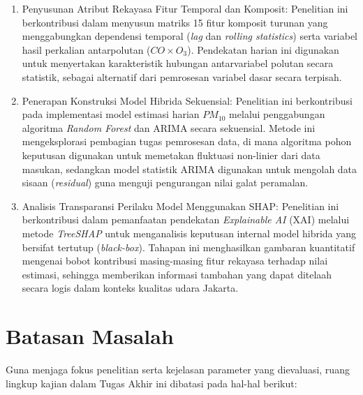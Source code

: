 \begin{enumerate}
   \item {Penyusunan Atribut Rekayasa Fitur Temporal dan Komposit:} Penelitian ini berkontribusi dalam menyusun matriks 15 fitur komposit turunan yang menggabungkan dependensi temporal (\textit{lag} dan \textit{rolling statistics}) serta variabel hasil perkalian antarpolutan ($CO \times O_3$). Pendekatan harian ini digunakan untuk menyertakan karakteristik hubungan antarvariabel polutan secara statistik, sebagai alternatif dari pemrosesan variabel dasar secara terpisah.
   \item {Penerapan Konstruksi Model Hibrida Sekuensial:} Penelitian ini berkontribusi pada implementasi model estimasi harian $PM_{10}$ melalui penggabungan algoritma \textit{Random Forest} dan ARIMA secara sekuensial. Metode ini mengeksplorasi pembagian tugas pemrosesan data, di mana algoritma pohon keputusan digunakan untuk memetakan fluktuasi non-linier dari data masukan, sedangkan model statistik ARIMA digunakan untuk mengolah data sisaan (\textit{residual}) guna menguji pengurangan nilai galat peramalan.
   \item {Analisis Transparansi Perilaku Model Menggunakan SHAP:} Penelitian ini berkontribusi dalam pemanfaatan pendekatan \textit{Explainable AI} (XAI) melalui metode \textit{TreeSHAP} untuk menganalisis keputusan internal model hibrida yang bersifat tertutup (\textit{black-box}). Tahapan ini menghasilkan gambaran kuantitatif mengenai bobot kontribusi masing-masing fitur rekayasa terhadap nilai estimasi, sehingga memberikan informasi tambahan yang dapat ditelaah secara logis dalam konteks kualitas udara Jakarta.
\end{enumerate}

\section{Batasan Masalah}

Guna menjaga fokus penelitian serta kejelasan parameter yang dievaluasi, ruang lingkup kajian dalam Tugas Akhir ini dibatasi pada hal-hal berikut:

\newpage

